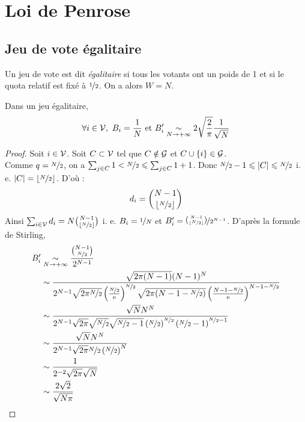 

\section{Loi de Penrose}


\subsection{Jeu de vote égalitaire}

\begin{definition}
	Un jeu de vote est dit \textit{égalitaire} si tous les votants ont un poids de 1 et si le quota relatif est fixé à $\nicefrac{1}{2}$. On a alors $W = N$.
\end{definition}

\begin{proposition}
	Dans un jeu égalitaire,
	\begin{equation}
		\forall i \in \mathcal{V}, \
		B_i = \frac{1}{N} \text{ et }
		B_i' \underset{N \rightarrow +\infty}{\sim} 2\sqrt{\frac{2}{\pi}} \frac{1}{\sqrt{N}}
	\end{equation}
\end{proposition}

\begin{proof}
	Soit $i \in \mathcal{V}$.
	Soit $C \subset \mathcal{V}$ tel que $C \notin \mathcal{G}$ et $C \cup \{i\} \in \mathcal{G}$. \\
	Comme $q = \nicefrac{N}{2}$, on a $\sum_{j \in C} 1 < \nicefrac{N}{2} \leqslant \sum_{j \in C} 1 + 1$. Donc $\nicefrac{N}{2} - 1 \leqslant |C| \leqslant \nicefrac{N}{2}$ i. e. $|C| = \lfloor \nicefrac{N}{2} \rfloor$. D'où :
	\begin{equation*}
		d_i = \binom{N - 1}{\lfloor \nicefrac{N}{2} \rfloor}
	\end{equation*}
	Ainsi $\sum_{i \in \mathcal{V}} d_i = N \binom{N - 1}{\lfloor \nicefrac{N}{2} \rfloor}$ i. e. $B_i = \nicefrac{1}{N}$ et $B_i' = \nicefrac{\binom{N - 1}{\lfloor \nicefrac{N}{2} \rfloor}}{2^{N-1}}$.
	D'après la formule de Stirling,
	\begin{align*}
		B_i'
		&\underset{N \rightarrow +\infty}{\sim} \frac{\binom{N - 1}{\nicefrac{N}{2}}}{2^{N-1}} \\
		&\sim  \frac{ \sqrt{2\pi(N-1)} (N-1)^N }{ 2^{N-1} \sqrt{2\pi\nicefrac{N}{2}} \left(\frac{\nicefrac{N}{2}}{\mathrm{e}}\right)^{\nicefrac{N}{2}} \sqrt{2\pi(N-1-\nicefrac{N}{2})} \left(\frac{N-1-\nicefrac{N}{2}}{\mathrm{e}}\right)^{N-1-\nicefrac{N}{2}} } \\
		&\sim \frac{ \sqrt{N} N^N }{ 2^{N-1} \sqrt{2\pi} \sqrt{\nicefrac{N}{2}} \sqrt{\nicefrac{N}{2}-1} \left(\nicefrac{N}{2}\right)^{\nicefrac{N}{2}} \left(\nicefrac{N}{2}-1\right)^{\nicefrac{N}{2}-1} } \\
		&\sim \frac{ \sqrt{N} N^N }{ 2^{N-1} \sqrt{2\pi} \nicefrac{N}{2} \left(\nicefrac{N}{2}\right)^N } \\
		&\sim \frac{1}{ 2^{-2} \sqrt{2\pi} \sqrt{N}} \\
		&\sim \frac{2\sqrt2}{\sqrt{N\pi}}
	\end{align*}
\end{proof}

